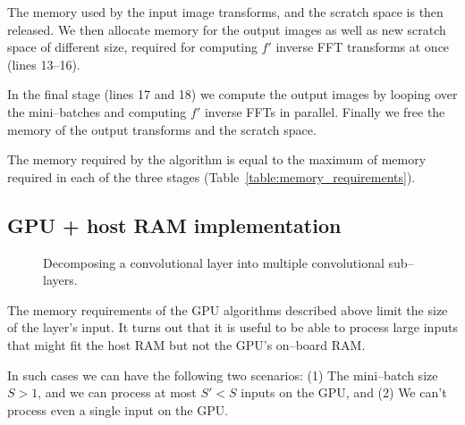 \documentclass[conference]{IEEEtran}
\begin{document}
  The memory used by the input image transforms, and the scratch space
  is then released.  We then allocate memory for the output images as
  well as new scratch space of different size, required for computing
  $f'$ inverse FFT transforms at once (lines 13--16).

  In the final stage (lines 17 and 18) we compute the output images by
  looping over the mini--batches and computing $f'$ inverse FFTs in
  parallel.  Finally we free the memory of the output transforms and
  the scratch space.

  The memory required by the algorithm is equal to the maximum of
  memory required in each of the three stages
  (Table~\ref{table:memory_requirements}).

\subsection{GPU + host RAM implementation}

  \begin{figure}
    \centering
    \caption{Decomposing a convolutional layer into multiple
      convolutional sub--layers.}
    \label{fig:partial_exec}
  \end{figure}

  The memory requirements of the GPU algorithms described above limit
  the size of the layer's input.  It turns out that it is useful to be
  able to process large inputs that might fit the host RAM but not the
  GPU's on--board RAM.

  In such cases we can have the following two scenarios: (1) The
  mini--batch size $S > 1$, and we can process at most $S' < S$ inputs
  on the GPU, and (2) We can't process even a single input on the GPU.
\end{document}
